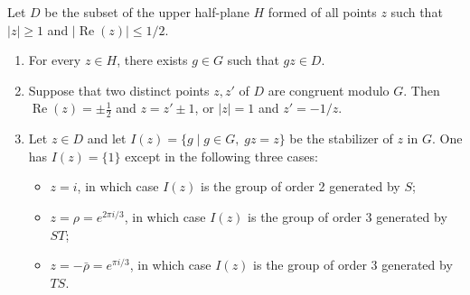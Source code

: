Let $D$ be the subset of the upper half-plane $H$ formed of all points $z$ such that $|z| \geq 1$ and $|\operatorname{Re}(z)| \leq 1/2$.

\begin{enumerate}
\item[(1)] For every $z \in H$, there exists $g \in G$ such that $gz \in D$.
\item[(2)] Suppose that two distinct points $z, z'$ of $D$ are congruent modulo $G$. Then $\operatorname{Re}(z) = \pm \frac{1}{2}$ and $z = z' \pm 1$, or $|z| = 1$ and $z' = -1/z$.
\item[(3)] Let $z \in D$ and let $I(z) = \{g \mid g \in G,\; gz = z\}$ be the stabilizer of $z$ in $G$. One has $I(z) = \{1\}$ except in the following three cases:
\begin{itemize}
\item $z = i$, in which case $I(z)$ is the group of order 2 generated by $S$;
\item $z = \rho = e^{2\pi i/3}$, in which case $I(z)$ is the group of order 3 generated by $ST$;
\item $z = -\bar{\rho} = e^{\pi i/3}$, in which case $I(z)$ is the group of order 3 generated by $TS$.
\end{itemize}
\end{enumerate}
